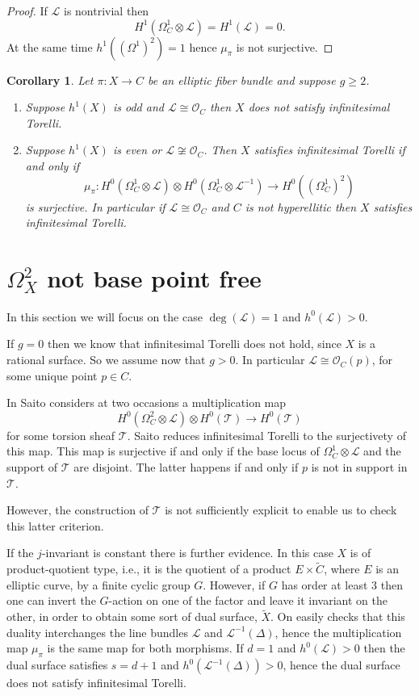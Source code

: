 \documentclass{amsart}
\newcommand{\cL}{\mathcal{L}}
\newcommand{\cO}{\mathcal{O}}
\newcommand{\cT}{\mathcal{T}}
\newtheorem{corollary}[theorem]{Corollary}
\theoremstyle{definition}
\theoremstyle{remark}
\begin{document}
\begin{proof}
If $\cL$ is nontrivial then
\[ H^1(\Omega^1_C\otimes \cL)=H^1(\cL)=0.\]
At the same time $h^1((\Omega^1)^2)=1$ hence $\mu_\pi$ is not surjective.
\end{proof}

\begin{corollary}Let $\pi: X \to C$ be an elliptic fiber bundle and suppose $g\geq 2$.
\begin{enumerate}
\item Suppose $h^1(X)$ is odd and $\cL\cong \cO_C$ then $X$ does not satisfy infinitesimal Torelli.
\item Suppose $h^1(X)$ is even or $\cL\not \cong \cO_C$. Then $X$ satisfies infinitesimal Torelli if and only if 
\[ \mu_\pi: H^0(\Omega^1_C\otimes \cL) \otimes  H^0(\Omega^1_C\otimes \cL ^{-1}) \to H^0((\Omega^1_C)^2)\]
is surjective. In particular if $\cL\cong \cO_C$ and $C$ is not hyperellitic then $X$ satisfies infinitesimal Torelli.
\end{enumerate}
\end{corollary}



\section{$\Omega^2_X$ not base point free}\label{secConj}
In this section we will focus on the case $\deg(\cL)=1$ and $h^0(\cL)>0$.

If $g=0$ then we know that infinitesimal Torelli does not hold, since $X$ is a rational surface. So we assume now that $g>0$. In particular  $\cL\cong \cO_C(p)$, for some  unique point $p\in C$.

In \cite{Sai} Saito considers at two occasions a multiplication map
\[ H^0(\Omega^2_C\otimes \cL)\otimes H^0(\cT) \to H^0(\cT)\]
for some torsion sheaf $\cT$. Saito reduces infinitesimal Torelli to the surjectivety of this map. This map is surjective if and only if the base locus of $\Omega^1_C\otimes \cL$ and the support of $\cT$ are disjoint. The latter happens if and only if $p$ is not in support in $\cT$.

However, the construction of $\cT$ is not sufficiently explicit to enable us to check this latter criterion. 






If the $j$-invariant is constant there is further evidence. In this case $X$ is of product-quotient type, i.e., it is the quotient of a product $E\times \tilde{C}$, where $E$ is an elliptic curve, by a finite cyclic group $G$. However,  if $G$ has order at least 3 then one can invert the $G$-action on one of the factor and leave it invariant on the other, in order to obtain  some sort of dual surface, $\tilde{X}$. On easily checks that this duality interchanges the line bundles $\cL$ and $\cL^{-1}(\Delta)$, hence the multiplication map $\mu_{\pi}$ is the same map for both morphisms. If $d=1$ and $h^0(\cL)>0$ then the dual surface satisfies $s=d+1$ and $h^0(\cL^{-1}(\Delta))>0$, hence the dual surface does not satisfy infinitesimal Torelli.
\end{document}
